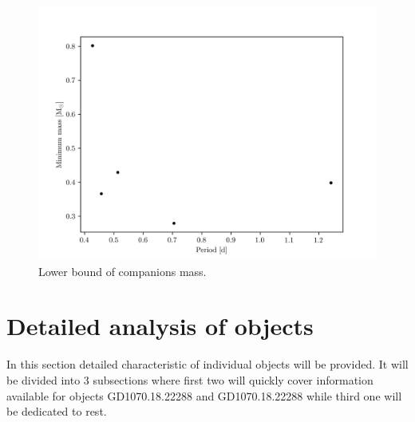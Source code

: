 \documentclass{pracalicmgr}
\begin{document}
\begin{figure}
    \includegraphics{plots/mass_minimum_estimate.png}
    \caption{Lower bound of companions mass.}\label{lower_mass}
\end{figure}

\section{Detailed analysis of objects}
In this section detailed characteristic of individual objects will be provided. It will be divided into $3$ subsections where first two will quickly cover information available for 
objects GD1070.18.22288 and GD1070.18.22288 while third one will be dedicated to rest.
\end{document}
